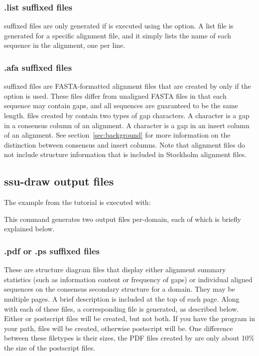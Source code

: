 \subsubsection{.list suffixed files}
 suffixed files are only generated if  is
executed using the  option. A list file is generated for
a specific alignment file, and it simply lists the name of each
sequence in the alignment, one per line.

\subsubsection{.afa suffixed files}
 suffixed files are FASTA-formatted alignment files that
are created by  only if the  option is
used. These files differ from unaligned FASTA files in that each
sequence may contain gaps, and all sequences are guaranteed to be
the same length.  files created by 
contain two types of gap characters. A \prog{-} character
is a gap in a consensus column of an alignment. A  character
is a gap in an insert column of an alignment. See
section~\ref{sec:background} for more information on the distinction
between consensus and insert columns. Note that  alignment
files do not include structure information that is included in
Stockholm alignment files.

\subsection{ssu-draw output files}

The  example from the tutorial is executed with:


This command generates two output files per-domain, each of which is 
briefly explained below. 

\subsubsection{.pdf or .ps suffixed files}
These are structure diagram files that display either alignment
summary statistics (such as information content or frequency of gaps)
or individual aligned sequences on the consensus secondary structure
for a domain. They may be multiple pages. A brief description is
included at the top of each page. Along with each of these files, a
corresponding  file is generated, as described below.
Either  or postscript  files will
be created, but not both. If you have the program  in
your path,  files will be created, otherwise postscript
will be. One difference between
these filetypes is their sizes, the PDF files created by
 are only about 10\% the size of the postscript files.


